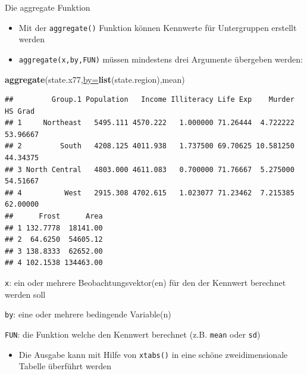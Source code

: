 \documentclass[
  ignorenonframetext,
]{beamer}
\newenvironment{Shaded}{\begin{snugshade}}{\end{snugshade}}
\newcommand{\DataTypeTok}[1]{\textcolor[rgb]{0.74,0.68,0.62}{\underline{#1}}}
\newcommand{\KeywordTok}[1]{\textcolor[rgb]{0.26,0.66,0.93}{\textbf{#1}}}
\newcommand{\NormalTok}[1]{\textcolor[rgb]{0.74,0.68,0.62}{#1}}
\providecommand{\tightlist}{%
  \setlength{\itemsep}{0pt}\setlength{\parskip}{0pt}}
\begin{document}
\begin{frame}[fragile]{Die aggregate Funktion}
\protect\hypertarget{die-aggregate-funktion}{}

\begin{itemize}
\tightlist
\item
  Mit der \texttt{aggregate()} Funktion können Kennwerte für
  Untergruppen erstellt werden
\item
  \texttt{aggregate(x,by,FUN)} müssen mindestens drei Argumente
  übergeben werden:
\end{itemize}

\begin{Shaded}
\begin{Highlighting}[]
\KeywordTok{aggregate}\NormalTok{(state.x77,}\DataTypeTok{by=}\KeywordTok{list}\NormalTok{(state.region),mean)}
\end{Highlighting}
\end{Shaded}

\begin{verbatim}
##         Group.1 Population   Income Illiteracy Life Exp    Murder  HS Grad
## 1     Northeast   5495.111 4570.222   1.000000 71.26444  4.722222 53.96667
## 2         South   4208.125 4011.938   1.737500 69.70625 10.581250 44.34375
## 3 North Central   4803.000 4611.083   0.700000 71.76667  5.275000 54.51667
## 4          West   2915.308 4702.615   1.023077 71.23462  7.215385 62.00000
##      Frost      Area
## 1 132.7778  18141.00
## 2  64.6250  54605.12
## 3 138.8333  62652.00
## 4 102.1538 134463.00
\end{verbatim}

\texttt{x}: ein oder mehrere Beobachtungsvektor(en) für den der Kennwert
berechnet werden soll

\texttt{by}: eine oder mehrere bedingende Variable(n)

\texttt{FUN}: die Funktion welche den Kennwert berechnet (z.B.
\texttt{mean} oder \texttt{sd})

\begin{itemize}
\tightlist
\item
  Die Ausgabe kann mit Hilfe von \texttt{xtabs()} in eine schöne
  zweidimensionale Tabelle überführt werden
\end{itemize}

\end{frame}
\end{document}
